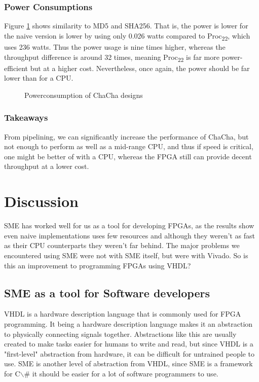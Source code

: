 \documentclass[a4paper, openany]{book}
\begin{document}
\begin{abstact}
\subsection{Power Consumptions}
\label{sec:orgfca0886}
Figure \ref{fig:ChaCha_power} shows similarity to MD5 and SHA256. That is, the power is lower for the naive version is lower by using only 0.026 watts compared to Proc\textsubscript{22}, which uses 236 watts. Thus the power usage is nine times higher, whereas the throughput difference is around 32 times, meaning Proc\textsubscript{22} is far more power-efficient but at a higher cost. Nevertheless, once again, the power should be far lower than for a CPU.

\begin{figure}[H]
\centering
{}
\caption[Power consumption of ChaCha20 designs]
{Powerconsumption of ChaCha designs}
\label{fig:ChaCha_power}
\end{figure}
\subsection{Takeaways}
\label{sec:org903491c}
From pipelining, we can significantly increase the performance of ChaCha, but not enough to perform as well as a mid-range CPU, and thus if speed is critical, one might be better of with a CPU, whereas the FPGA still can provide decent throughput at a lower cost.

\chapter{Discussion}
\label{sec:orgf869832}
SME has worked well for us as a tool for developing FPGAs, as the results show even naive implementations uses few resources
and although they weren't as fast as their CPU counterparts they weren't far behind. The major problems we encountered using SME were not with SME itself,
but were with Vivado. So is this an improvement to programming FPGAs using VHDL?

\section{SME as a tool for Software developers}
\label{sec:org4d65394}
VHDL is a hardware description language that is commonly used for FPGA programming.
It being a hardware description language makes it an abstraction to physically connecting signals together.
Abstractions like this are usually created to make tasks easier for humans to write and read,
but since VHDL is a "first-level" abstraction from hardware, it can be difficult for untrained people to use.
SME is another level of abstraction from VHDL, since SME is a framework for C$\backslash$# it should be easier for a lot of software programmers to use.


\end{abstact}
\end{document}
